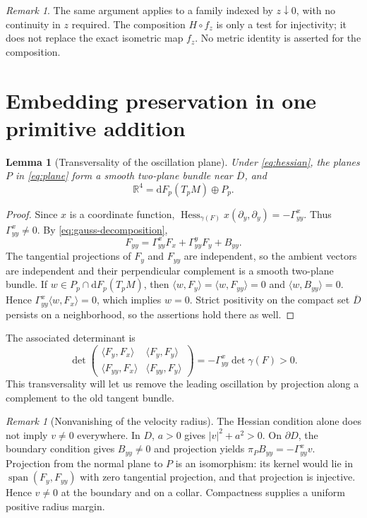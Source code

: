 \documentclass[11pt,a4paper]{article}
\newcommand{\R}{\mathbb R}
\newcommand{\dd}{\mathrm d}
\newcommand{\Hess}{\operatorname{Hess}}
\newcommand{\Span}{\operatorname{span}}
\newtheorem{lemma}[theorem]{Lemma}
\theoremstyle{definition}
\theoremstyle{remark}
\newtheorem{remark}[theorem]{Remark}
\numberwithin{equation}{section}
\begin{document}
\begin{remark}
The same argument applies to a family indexed by $z\downarrow0$, with
no continuity in $z$ required. The composition $H\circ f_z$ is only a
test for injectivity; it does not replace the exact isometric map $f_z$.
No metric identity is asserted for the composition.
\end{remark}

\section{Embedding preservation in one primitive addition}
\label{sec:primitive}

\begin{lemma}[Transversality of the oscillation plane]
\label{lem:plane}
Under \eqref{eq:hessian}, the planes $P$ in \eqref{eq:plane} form a
smooth two-plane bundle near $\overline D$, and
\begin{equation}
 \R^4=\dd F_p(T_pM)\oplus P_p.
 \label{eq:complement}
\end{equation}
\end{lemma}
\begin{proof}
Since $x$ is a coordinate function,
$\Hess_{\gamma(F)}x(\partial_y,\partial_y)=-\Gamma^x_{yy}$.
Thus $\Gamma^x_{yy}\ne0$. By \eqref{eq:gauss-decomposition},
\[
 F_{yy}=\Gamma^x_{yy}F_x+\Gamma^y_{yy}F_y+B_{yy}.
\]
The tangential projections of $F_y$ and $F_{yy}$ are independent,
so the ambient vectors are independent and their perpendicular
complement is a smooth two-plane bundle. If $w\in P_p\cap\dd F_p(T_pM)$,
then $\langle w,F_y\rangle=\langle w,F_{yy}\rangle=0$ and
$\langle w,B_{yy}\rangle=0$. Hence
$\Gamma^x_{yy}\langle w,F_x\rangle=0$, which implies $w=0$.
Strict positivity on the compact set $\overline D$ persists on a
neighborhood, so the assertions hold there as well.
\end{proof}

The associated determinant is
\begin{equation}
 \det\begin{pmatrix}
 \langle F_y,F_x\rangle&\langle F_y,F_y\rangle\\
 \langle F_{yy},F_x\rangle&\langle F_{yy},F_y\rangle
 \end{pmatrix}
 =-\Gamma^x_{yy}\det\gamma(F)>0.
 \label{eq:determinant}
\end{equation}
This transversality will let us remove the leading oscillation by
projection along a complement to the old tangent bundle.

\begin{remark}[Nonvanishing of the velocity radius]
The Hessian condition alone does not imply $v\ne0$ everywhere.
In $D$, $a>0$ gives $|v|^2+a^2>0$. On $\partial D$, the boundary
condition gives $B_{yy}\ne0$ and projection yields
$\pi_PB_{yy}=-\Gamma^x_{yy}v$. Projection from the normal plane to $P$
is an isomorphism: its kernel would lie in
$\Span(F_y,F_{yy})$ with zero tangential projection, and that projection
is injective. Hence $v\ne0$ at the boundary and on a collar.
Compactness supplies a uniform positive radius margin.
\end{remark}
\end{document}
